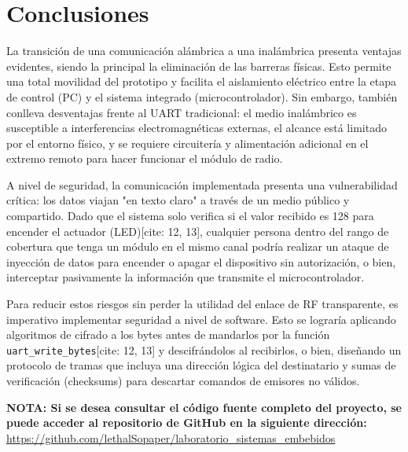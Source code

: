 \documentclass[12pt, letterpaper]{article}
\begin{document}
\section*{\centering \fontsize{14}{17}\sffamily\selectfont Conclusiones}

La transición de una comunicación alámbrica a una inalámbrica presenta ventajas evidentes, siendo la principal la eliminación de las barreras físicas. Esto permite una total movilidad del prototipo y facilita el aislamiento eléctrico entre la etapa de control (PC) y el sistema integrado (microcontrolador). Sin embargo, también conlleva desventajas frente al UART tradicional: el medio inalámbrico es susceptible a interferencias electromagnéticas externas, el alcance está limitado por el entorno físico, y se requiere circuitería y alimentación adicional en el extremo remoto para hacer funcionar el módulo de radio.

A nivel de seguridad, la comunicación implementada presenta una vulnerabilidad crítica: los datos viajan "en texto claro" a través de un medio público y compartido. Dado que el sistema solo verifica si el valor recibido es 128 para encender el actuador (LED)[cite: 12, 13], cualquier persona dentro del rango de cobertura que tenga un módulo en el mismo canal podría realizar un ataque de inyección de datos para encender o apagar el dispositivo sin autorización, o bien, interceptar pasivamente la información que transmite el microcontrolador.

Para reducir estos riesgos sin perder la utilidad del enlace de RF transparente, es imperativo implementar seguridad a nivel de software. Esto se lograría aplicando algoritmos de cifrado a los bytes antes de mandarlos por la función \texttt{uart\_write\_bytes}[cite: 12, 13] y descifrándolos al recibirlos, o bien, diseñando un protocolo de tramas que incluya una dirección lógica del destinatario y sumas de verificación (checksums) para descartar comandos de emisores no válidos.

% 

\newpage
\textbf{NOTA: Si se desea consultar el código fuente completo del proyecto, se puede acceder al repositorio de GitHub en la siguiente dirección:} \url{https://github.com/lethalSopaper/laboratorio_sistemas_embebidos}
\end{document}
